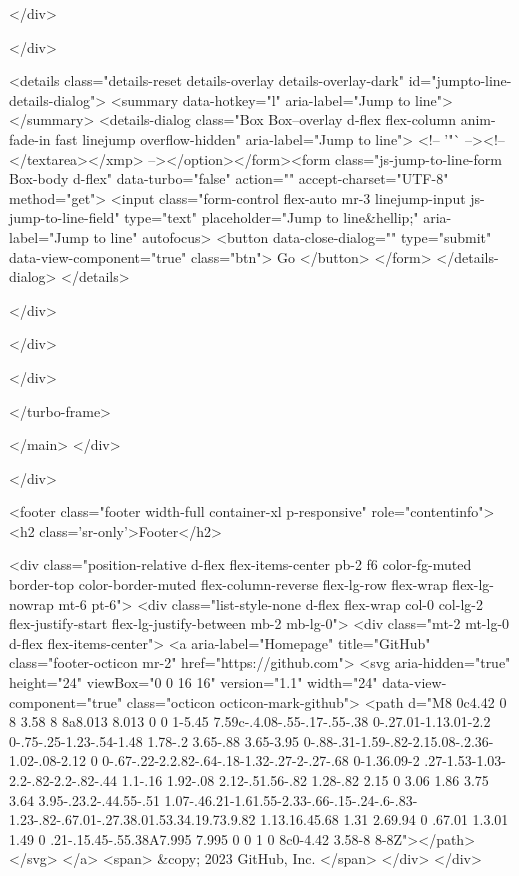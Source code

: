     </div>

    </div>


  

  <details class="details-reset details-overlay details-overlay-dark" id="jumpto-line-details-dialog">
    <summary data-hotkey="l" aria-label="Jump to line"></summary>
    <details-dialog class="Box Box--overlay d-flex flex-column anim-fade-in fast linejump overflow-hidden" aria-label="Jump to line">
      <!-- '"` --><!-- </textarea></xmp> --></option></form><form class="js-jump-to-line-form Box-body d-flex" data-turbo="false" action="" accept-charset="UTF-8" method="get">
        <input class="form-control flex-auto mr-3 linejump-input js-jump-to-line-field" type="text" placeholder="Jump to line&hellip;" aria-label="Jump to line" autofocus>
          <button data-close-dialog="" type="submit" data-view-component="true" class="btn">    Go
</button>
</form>    </details-dialog>
  </details>



</div>

  </div>


  </div>

</turbo-frame>


    </main>
  </div>

  </div>

          <footer class="footer width-full container-xl p-responsive" role="contentinfo">
  <h2 class='sr-only'>Footer</h2>

  <div class="position-relative d-flex flex-items-center pb-2 f6 color-fg-muted border-top color-border-muted flex-column-reverse flex-lg-row flex-wrap flex-lg-nowrap mt-6 pt-6">
    <div class="list-style-none d-flex flex-wrap col-0 col-lg-2 flex-justify-start flex-lg-justify-between mb-2 mb-lg-0">
      <div class="mt-2 mt-lg-0 d-flex flex-items-center">
        <a aria-label="Homepage" title="GitHub" class="footer-octicon mr-2" href="https://github.com">
          <svg aria-hidden="true" height="24" viewBox="0 0 16 16" version="1.1" width="24" data-view-component="true" class="octicon octicon-mark-github">
    <path d="M8 0c4.42 0 8 3.58 8 8a8.013 8.013 0 0 1-5.45 7.59c-.4.08-.55-.17-.55-.38 0-.27.01-1.13.01-2.2 0-.75-.25-1.23-.54-1.48 1.78-.2 3.65-.88 3.65-3.95 0-.88-.31-1.59-.82-2.15.08-.2.36-1.02-.08-2.12 0 0-.67-.22-2.2.82-.64-.18-1.32-.27-2-.27-.68 0-1.36.09-2 .27-1.53-1.03-2.2-.82-2.2-.82-.44 1.1-.16 1.92-.08 2.12-.51.56-.82 1.28-.82 2.15 0 3.06 1.86 3.75 3.64 3.95-.23.2-.44.55-.51 1.07-.46.21-1.61.55-2.33-.66-.15-.24-.6-.83-1.23-.82-.67.01-.27.38.01.53.34.19.73.9.82 1.13.16.45.68 1.31 2.69.94 0 .67.01 1.3.01 1.49 0 .21-.15.45-.55.38A7.995 7.995 0 0 1 0 8c0-4.42 3.58-8 8-8Z"></path>
</svg>
</a>        <span>
        &copy; 2023 GitHub, Inc.
        </span>
      </div>
    </div>

